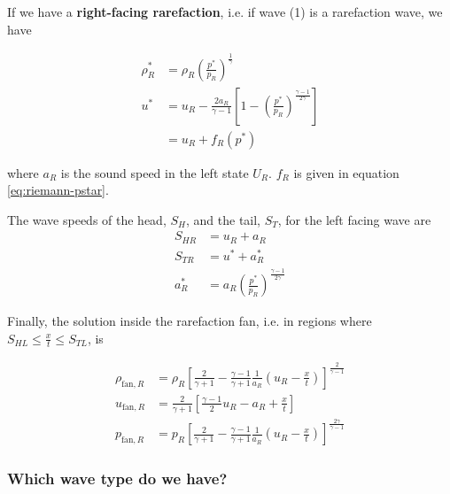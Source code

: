 If we have a \textbf{right-facing rarefaction}, i.e. if wave (1) is a rarefaction wave, we have

\begin{align*}
	\rho^*_R &= 
		\rho_R \left( \frac{p^*}{p_R} \right) ^ \frac{1}{\gamma}\\
	u^* &= 
		u_R - \frac{2 a_R}{\gamma - 1} \left[ 1 - \left( \frac{p^*}{p_R} \right) ^ \frac{\gamma - 1}{2 \gamma}  \right]\\
		&= u_R + f_R(p^*)
\end{align*}

where $a_R$ is the sound speed in the left state $U_R$.
$f_R$ is given in equation \ref{eq:riemann-pstar}.





The wave speeds of the head, $S_H$, and the tail, $S_T$, for the left facing wave are
\begin{align*}
	S_{HR} &= u_R + a_R\\
	S_{TR} &= u^* + a^*_R\\
	a^*_R  &= a_R \left( \frac{p^*}{p_R} \right) ^ \frac{\gamma - 1}{2 \gamma}
\end{align*}




Finally, the solution inside the rarefaction fan, i.e. in regions where $S_{HL} \leq \frac{x}{t} \leq S_{TL}$, is 

\begin{align}
	\rho_{\text{fan}, R} &= 
		\rho_R \left[ \frac{2}{\gamma + 1} - \frac{\gamma - 1}{\gamma + 1} \frac{1}{a_R} \left(u_R - \frac{x}{t}\right) \right] ^ \frac{2}{\gamma -1 } \label{eq:rho-rarefaction-fan-right}\\
	u_{\text{fan}, R} &= 
		\frac{2}{\gamma + 1} \left[ \frac{\gamma - 1}{2} u_R - a_R + \frac{x}{t}  \right] \\
	p_{\text{fan}, R} &= 
		p_R \left[ \frac{2}{\gamma + 1} - \frac{\gamma - 1}{\gamma + 1} \frac{1}{a_R} \left(u_R - \frac{x}{t}\right) \right] ^ \frac{2 \gamma}{\gamma -1} \label{eq:pressure-rarefaction-fan-right}
\end{align}












\subsubsection{Which wave type do we have?}


